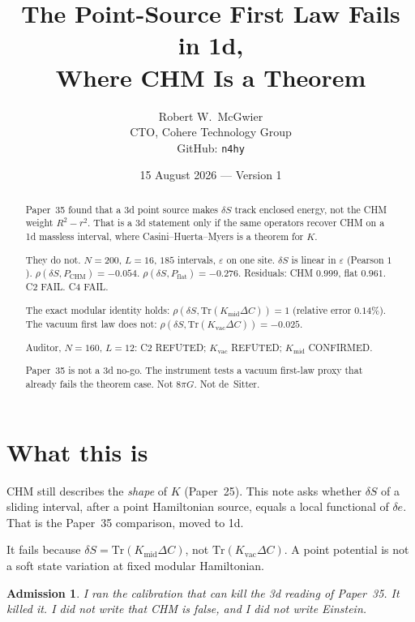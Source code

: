 \documentclass[11pt]{article}
\title{\textbf{The Point-Source First Law Fails in 1d,\\
Where CHM Is a Theorem}}
\author{Robert W.\ McGwier\\
\small CTO, Cohere Technology Group\\
\small GitHub: \texttt{n4hy}}
\date{15 August 2026 --- Version 1}
\newtheorem*{admission}{Admission}
\begin{document}
\maketitle

\begin{abstract}
\noindent
Paper~35 found that a 3d point source makes $\delta S$ track
enclosed energy, not the CHM weight $R^2-r^2$. That is a 3d
statement only if the same operators recover CHM on a 1d
massless interval, where Casini--Huerta--Myers is a theorem
for $K$.

They do not. $N=200$, $L=16$, $185$ intervals, $\varepsilon$
on one site. $\delta S$ is linear in $\varepsilon$ (Pearson $1$).
$\rho(\delta S,P_{\mathrm{CHM}})=-0.054$.
$\rho(\delta S,P_{\mathrm{flat}})=-0.276$.
Residuals: CHM $0.999$, flat $0.961$. C2 FAIL. C4 FAIL.

The exact modular identity holds:
$\rho(\delta S,\mathrm{Tr}(K_{\mathrm{mid}}\Delta C))=1$
(relative error $0.14\%$). The vacuum first law does not:
$\rho(\delta S,\mathrm{Tr}(K_{\mathrm{vac}}\Delta C))=-0.025$.

Auditor, $N=160$, $L=12$: C2 REFUTED; $K_{\mathrm{vac}}$
REFUTED; $K_{\mathrm{mid}}$ CONFIRMED.

Paper~35 is not a 3d no-go. The instrument tests a vacuum
first-law proxy that already fails the theorem case.
Not $8\pi G$. Not de~Sitter.
\end{abstract}

\section{What this is}

CHM still describes the \emph{shape} of $K$ (Paper~25).
This note asks whether $\delta S$ of a sliding interval,
after a point Hamiltonian source, equals a local functional
of $\delta e$. That is the Paper~35 comparison, moved to 1d.

It fails because $\delta S=\mathrm{Tr}(K_{\mathrm{mid}}\Delta C)$,
not $\mathrm{Tr}(K_{\mathrm{vac}}\Delta C)$. A point potential
is not a soft state variation at fixed modular Hamiltonian.

\begin{admission}
I ran the calibration that can kill the 3d reading of
Paper~35. It killed it. I did not write that CHM is false,
and I did not write Einstein.
\end{admission}
\end{document}
